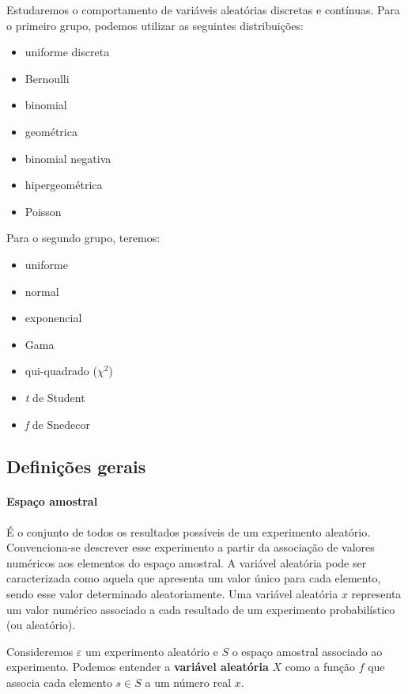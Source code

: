 Estudaremos o comportamento de variáveis aleatórias discretas e contínuas. Para
o primeiro grupo, podemos utilizar as seguintes distribuições:

\begin{itemize}
    \item uniforme discreta
    \item Bernoulli
    \item binomial
    \item geométrica
    \item binomial negativa
    \item hipergeométrica
    \item Poisson
\end{itemize}

Para o segundo grupo, teremos:

\begin{itemize}
    \item uniforme
    \item normal
    \item exponencial
    \item Gama
    \item qui-quadrado ($\chi^2$)
    \item \emph{t} de Student
    \item \emph{f} de Snedecor
\end{itemize}

\subsection{Definições gerais}%

\paragraph{Espaço amostral}
É o conjunto de todos os resultados possíveis de um experimento aleatório.
Convenciona-se descrever esse experimento a partir da associação de valores
numéricos aos elementos do espaço amostral. A variável aleatória pode ser
caracterizada como aquela que apresenta um valor único para cada elemento,
sendo esse valor determinado aleatoriamente. Uma variável aleatória $x$
representa um valor numérico associado a cada resultado de um experimento
probabilístico (ou aleatório).

\begin{definition}
    Consideremos $\varepsilon$ um experimento aleatório e $S$ o espaço amostral
    associado ao experimento. Podemos entender a \textbf{variável aleatória}
    $X$ como a função $f$ que associa cada elemento $s \in S$ a um número real
    $x$.
    \label{def:espaco-amostral}
\end{definition}

